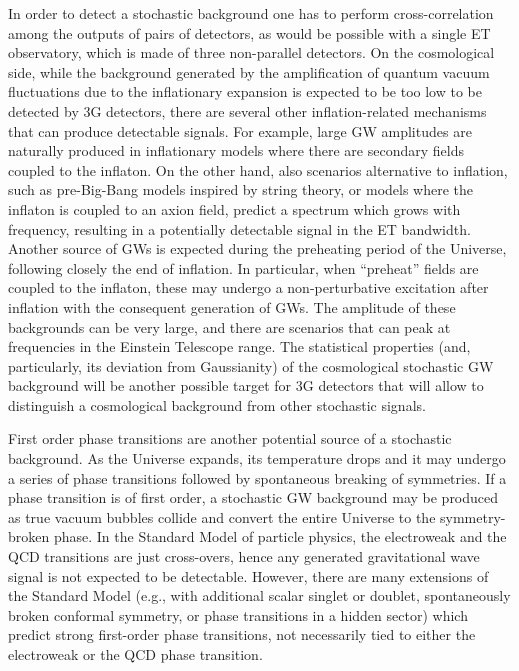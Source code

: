 In order to detect a stochastic background one has to perform cross-correlation among the outputs of pairs of detectors, as would be possible with a single ET observatory, which is made of three non-parallel detectors.
On the cosmological side, while the background  generated  by the amplification of quantum vacuum fluctuations due to the inflationary expansion is expected to be too low to be detected by  3G detectors, there are several other inflation-related mechanisms that can produce detectable signals.%
For example,  large GW amplitudes are naturally produced in inflationary models where there are secondary fields coupled to the inflaton.%
On the other hand, also scenarios alternative to inflation, such as pre-Big-Bang models inspired by string theory,
or models where the inflaton is coupled to an axion field,
predict a spectrum which grows with frequency, resulting in a potentially detectable signal in the ET bandwidth.
Another source of GWs is expected during the preheating period of the Universe, following closely the end of inflation.
In particular, when ``preheat'' fields are coupled to the inflaton, these may undergo
a non-perturbative excitation after inflation with the consequent generation of GWs. The amplitude of these backgrounds can be very large, and there are scenarios that can peak at frequencies in the Einstein Telescope range. 
The statistical properties (and, particularly, its deviation from Gaussianity) of the cosmological stochastic GW background will be another possible target for 3G detectors that will allow to distinguish a cosmological background from other stochastic signals.



First order phase transitions are another potential source of  a stochastic background.
As the Universe expands, its temperature drops and it may undergo a series of phase transitions followed by spontaneous breaking of symmetries. If a phase transition is of first order,  a  stochastic GW background may be produced as true vacuum bubbles collide and convert the entire Universe to the symmetry-broken phase.
In the Standard Model  of particle physics, the electroweak and the QCD  transitions are just  cross-overs, hence any generated gravitational wave signal is not expected to be detectable. However, there are many extensions of the Standard Model (e.g., with additional scalar singlet or doublet, spontaneously broken conformal symmetry, or phase transitions in a hidden sector) which predict strong first-order phase transitions, not necessarily tied to either the electroweak or the QCD phase transition. 

